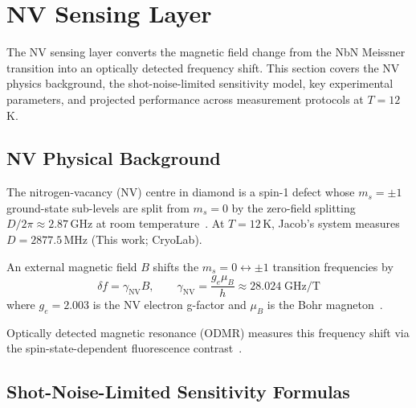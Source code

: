 
\section{NV Sensing Layer}
\label{sec:nv-sensing}

The NV sensing layer converts the magnetic field change from the NbN Meissner transition
into an optically detected frequency shift. This section covers the NV physics background,
the shot-noise-limited sensitivity model, key experimental parameters, and projected
performance across measurement protocols at $T = 12$\,K.

\subsection{NV Physical Background}
\label{sec:nv-physics}

The nitrogen-vacancy (NV) centre in diamond is a spin-1 defect whose $m_s = \pm 1$
ground-state sub-levels are split from $m_s = 0$ by the zero-field splitting
$D/2\pi \approx 2.87$\,GHz at room temperature~\cite{Doherty2013}. %
At $T = 12$\,K, Jacob's system measures $D = 2877.5$\,MHz (This work; CryoLab).

An external magnetic field $B$ shifts the $m_s = 0 \leftrightarrow \pm 1$ transition
frequencies by
\begin{equation}
  \delta f = \gamma_\mathrm{NV} B,
  \qquad \gamma_\mathrm{NV} = \frac{g_e \mu_B}{h} \approx 28.024\;\text{GHz/T}
  \label{eq:freq_shift}
\end{equation}
where $g_e = 2.003$ is the NV electron g-factor and $\mu_B$ is the Bohr
magneton~\cite{Doherty2013}. %

Optically detected magnetic resonance (ODMR) measures this frequency shift via the
spin-state-dependent fluorescence contrast~\cite{Barry2020}.

\subsection{Shot-Noise-Limited Sensitivity Formulas}
\label{sec:sensitivity_formulas}

